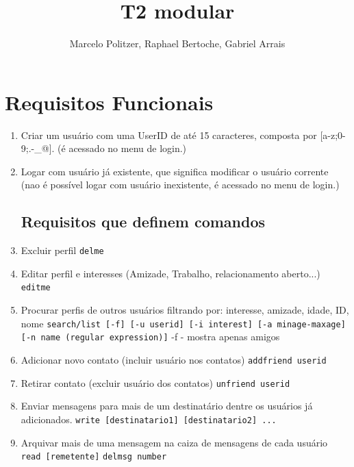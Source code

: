 \documentclass[a4paper,8pt]{article}
\title{T2 modular}
\author{Marcelo Politzer, Raphael Bertoche, Gabriel Arrais}
\begin{document}
\maketitle

\section{Requisitos Funcionais}


\begin{enumerate}
\item Criar um usuário com uma UserID de até 15 caracteres, composta por
[a-z;0-9;.-\_@]. (é acessado no menu de login.)

\item Logar com usuário já existente, que significa modificar o usuário
 corrente (nao é possível logar com usuário inexistente, é acessado no menu
 de login.)

\subsection{Requisitos que definem comandos}
\item Excluir perfil
 \newline\texttt{delme}

\item Editar perfil e interesses (Amizade, Trabalho, relacionamento aberto...)
\newline\texttt{editme}

\item Procurar perfis de outros usuários filtrando por: interesse, amizade,
 idade, ID, nome
 \newline\texttt{search/list [-f] [-u userid] [-i interest] [-a minage-maxage]
 [-n name (regular expression)]}
 \newline-f - mostra apenas amigos

\item Adicionar novo contato (incluir usuário nos contatos)
 \newline\texttt{addfriend userid}

\item Retirar contato (excluir usuário dos contatos)
 \newline\texttt{unfriend userid}

\item Enviar mensagens para mais de um destinatário dentre os usuários já
 adicionados.
 \newline\texttt{write [destinatario1] [destinatario2] ...}

\item Arquivar mais de uma mensagem na caiza de mensagens de cada usuário
 \newline\texttt{read [remetente]}
 \newline\texttt{delmsg number}

\end{enumerate}
\end{document}
